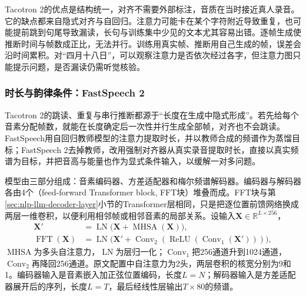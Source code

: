Tacotron 2的优点是结构统一，对齐不需要外部标注，音质在当时接近真人录音。它的缺点都来自隐式对齐与自回归。注意力可能卡在某个字符附近导致重复，也可能提前跳到句尾导致漏读，长句与训练集中少见的文本尤其容易出错。逐帧生成使推断时间与帧数成正比，无法并行。训练用真实帧、推断用自己生成的帧，误差会沿时间累积。对“四月十八日”，可以观察注意力是否依次经过各字，但注意力图只能提示问题，是否漏读仍需听觉核验。

\subsubsection{时长与韵律条件：FastSpeech 2}
\label{sec:nlp-speech-fastspeech}

Tacotron 2的跳读、重复与串行推断都源于“长度在生成中隐式形成”。若先给每个音素分配帧数，就能在长度确定后一次性并行生成全部帧，对齐也不会跳读。FastSpeech用自回归教师模型的注意力提取时长，并以教师合成的频谱作为蒸馏目标；FastSpeech 2去掉教师，改用强制对齐器从真实录音提取时长，直接以真实频谱为目标，并把音高与能量也作为显式条件输入，以缓解一对多问题。

模型由三部分组成：音素编码器、方差适配器和梅尔频谱解码器。编码器与解码器各由4个（feed-forward Transformer block, FFT块）堆叠而成。FFT块与第\ref{sec:nlp-llm-decoder-layer}小节的Transformer层相同，只是把逐位置前馈网络换成两层一维卷积，以便利用相邻帧或相邻音素的局部关系。设输入$\bm{X}\in\mathbb{R}^{L\times256}$，
\begin{equation}
\begin{aligned}
  \bm{X}'&=\operatorname{LN}\bigl(\bm{X}+\operatorname{MHSA}(\bm{X})\bigr),\\
  \operatorname{FFT}(\bm{X})&=\operatorname{LN}\bigl(\bm{X}'+\operatorname{Conv}_{2}(\operatorname{ReLU}(\operatorname{Conv}_{1}(\bm{X}')))\bigr),
\end{aligned}
\label{eq:nlp-speech-fft-block}
\end{equation}
$\operatorname{MHSA}$为多头自注意力，$\operatorname{LN}$为层归一化；$\operatorname{Conv}_1$把256通道升到1024通道，$\operatorname{Conv}_2$再降回256通道。原文配置中自注意力为2头，两层卷积的核宽分别为9和1。编码器输入是音素嵌入加正弦位置编码，长度$L=N$；解码器输入是方差适配器展开后的序列，长度$L=T$，最后经线性层输出$T\times80$的频谱。

